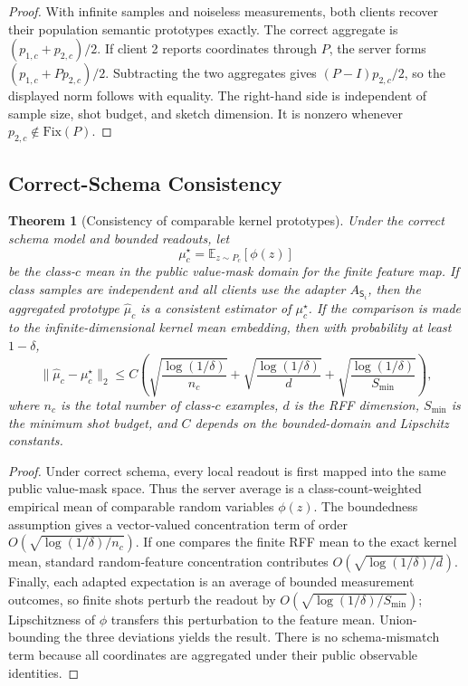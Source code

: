 \documentclass[preprint]{elsarticle}
\newcommand{\schema}{\mathsf{S}}
\newcommand{\E}{\mathbb{E}}
\newtheorem{theorem}{Theorem}
\begin{document}
\begin{proof}
With infinite samples and noiseless measurements, both clients recover their population semantic prototypes exactly. The correct aggregate is \((p_{1,c}+p_{2,c})/2\). If client 2 reports coordinates through \(P\), the server forms \((p_{1,c}+Pp_{2,c})/2\). Subtracting the two aggregates gives \((P-I)p_{2,c}/2\), so the displayed norm follows with equality. The right-hand side is independent of sample size, shot budget, and sketch dimension. It is nonzero whenever \(p_{2,c}\notin\mathrm{Fix}(P)\).
\end{proof}

\subsection{Correct-Schema Consistency}

\begin{theorem}[Consistency of comparable kernel prototypes]
Under the correct schema model and bounded readouts, let
\begin{equation}
    \mu_c^\star=\E_{z\sim P_c}[\phi(z)]
\end{equation}
be the class-\(c\) mean in the public value-mask domain for the finite feature map. If class samples are independent and all clients use the adapter \(A_{\schema_i}\), then the aggregated prototype \(\hat{\mu}_c\) is a consistent estimator of \(\mu_c^\star\). If the comparison is made to the infinite-dimensional kernel mean embedding, then with probability at least \(1-\delta\),
\begin{equation}
    \|\hat{\mu}_c-\mu_c^\star\|_2
    \le
    C\!\left(
    \sqrt{\frac{\log(1/\delta)}{n_c}}
    +
    \sqrt{\frac{\log(1/\delta)}{d}}
    +
    \sqrt{\frac{\log(1/\delta)}{S_{\min}}}
    \right),
\end{equation}
where \(n_c\) is the total number of class-\(c\) examples, \(d\) is the RFF dimension, \(S_{\min}\) is the minimum shot budget, and \(C\) depends on the bounded-domain and Lipschitz constants.
\end{theorem}

\begin{proof}
Under correct schema, every local readout is first mapped into the same public value-mask space. Thus the server average is a class-count-weighted empirical mean of comparable random variables \(\phi(z)\). The boundedness assumption gives a vector-valued concentration term of order \(O(\sqrt{\log(1/\delta)/n_c})\). If one compares the finite RFF mean to the exact kernel mean, standard random-feature concentration contributes \(O(\sqrt{\log(1/\delta)/d})\). Finally, each adapted expectation is an average of bounded measurement outcomes, so finite shots perturb the readout by \(O(\sqrt{\log(1/\delta)/S_{\min}})\); Lipschitzness of \(\phi\) transfers this perturbation to the feature mean. Union-bounding the three deviations yields the result. There is no schema-mismatch term because all coordinates are aggregated under their public observable identities.
\end{proof}
\end{document}
